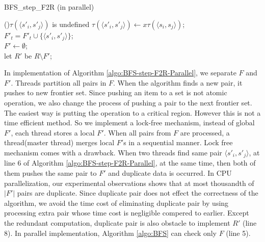 \documentclass[12pt]{article}
\begin{document}
\begin{algorithm}[ht]
	\label{algo:BFS-step-F2R-Parallel}
	\caption{BFS\_step\_F2R (in parallel)}
	
	
	{
		{
			{
				\If(){$\tau({\langle s'_i,s'_j\rangle})$ is undefined}
				{
					$\tau(\langle s'_i,s'_j\rangle) \longleftarrow x \tau(\langle s_i,s_j\rangle )$;\\
					$F'_t = F'_t \cup \{ \langle s'_i,s'_j \rangle  \} $;\\
				}
			}
		}
	}
	$F' \longleftarrow \emptyset$;\\
	let $R'$ be $R \setminus F'$;
\end{algorithm}

In implementation of Algorithm \ref{algo:BFS-step-F2R-Parallel}, we separate $F$ and $F'$. Threads partition all pairs in $F$. When the algorithm finds a new pair, it pushes to new frontier set. Since pushing an item to a set is not atomic operation, we also change the process of pushing a pair to the next frontier set. The easiest way is putting the operation to a critical region. However this is not a time efficient method. So we implement a lock-free mechanism, instead of global $F'$, each thread stores a local $F'$. When all pairs from $F$ are processed, a thread(master thread) merges local $F'$s in a sequential manner. Lock free mechanism comes with a drawback. When two threads find same pair $\langle s'_i,s'_j\rangle$, at line 6 of Algorithm \ref{algo:BFS-step-F2R-Parallel}, at the same time, then both of them pushes the same pair to $F'$ and duplicate data is occurred. In CPU parallelization, our experimental observations shows that at most thousandth of $|F'|$ pairs are duplicate. Since duplicate pair does not effect the correctness of the algorithm, we avoid the time cost of eliminating duplicate pair by using processing extra pair whose time cost is negligible compered to earlier. Except the redundant computation, duplicate pair is also obstacle to implement $R'$ (line 8). In parallel implementation, Algorithm  \ref{algo:BFS} can check only $F$ (line 5).  
\end{document}
